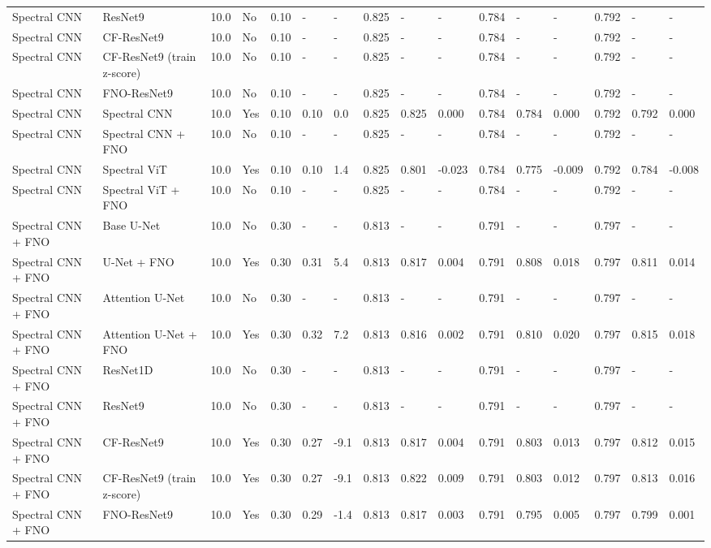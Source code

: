 \begin{longtable}{llllllllllllllll}
Spectral CNN & ResNet9 & 10.0 & No & 0.10 & - & - & 0.825 & - & - & 0.784 & - & - & 0.792 & - & - \\
Spectral CNN & CF-ResNet9 & 10.0 & No & 0.10 & - & - & 0.825 & - & - & 0.784 & - & - & 0.792 & - & - \\
Spectral CNN & CF-ResNet9 (train z-score) & 10.0 & No & 0.10 & - & - & 0.825 & - & - & 0.784 & - & - & 0.792 & - & - \\
Spectral CNN & FNO-ResNet9 & 10.0 & No & 0.10 & - & - & 0.825 & - & - & 0.784 & - & - & 0.792 & - & - \\
Spectral CNN & Spectral CNN & 10.0 & Yes & 0.10 & 0.10 & 0.0 & 0.825 & 0.825 & 0.000 & 0.784 & 0.784 & 0.000 & 0.792 & 0.792 & 0.000 \\
Spectral CNN & Spectral CNN + FNO & 10.0 & No & 0.10 & - & - & 0.825 & - & - & 0.784 & - & - & 0.792 & - & - \\
Spectral CNN & Spectral ViT & 10.0 & Yes & 0.10 & 0.10 & 1.4 & 0.825 & 0.801 & -0.023 & 0.784 & 0.775 & -0.009 & 0.792 & 0.784 & -0.008 \\
Spectral CNN & Spectral ViT + FNO & 10.0 & No & 0.10 & - & - & 0.825 & - & - & 0.784 & - & - & 0.792 & - & - \\
Spectral CNN + FNO & Base U-Net & 10.0 & No & 0.30 & - & - & 0.813 & - & - & 0.791 & - & - & 0.797 & - & - \\
Spectral CNN + FNO & U-Net + FNO & 10.0 & Yes & 0.30 & 0.31 & 5.4 & 0.813 & 0.817 & 0.004 & 0.791 & 0.808 & 0.018 & 0.797 & 0.811 & 0.014 \\
Spectral CNN + FNO & Attention U-Net & 10.0 & No & 0.30 & - & - & 0.813 & - & - & 0.791 & - & - & 0.797 & - & - \\
Spectral CNN + FNO & Attention U-Net + FNO & 10.0 & Yes & 0.30 & 0.32 & 7.2 & 0.813 & 0.816 & 0.002 & 0.791 & 0.810 & 0.020 & 0.797 & 0.815 & 0.018 \\
Spectral CNN + FNO & ResNet1D & 10.0 & No & 0.30 & - & - & 0.813 & - & - & 0.791 & - & - & 0.797 & - & - \\
Spectral CNN + FNO & ResNet9 & 10.0 & No & 0.30 & - & - & 0.813 & - & - & 0.791 & - & - & 0.797 & - & - \\
Spectral CNN + FNO & CF-ResNet9 & 10.0 & Yes & 0.30 & 0.27 & -9.1 & 0.813 & 0.817 & 0.004 & 0.791 & 0.803 & 0.013 & 0.797 & 0.812 & 0.015 \\
Spectral CNN + FNO & CF-ResNet9 (train z-score) & 10.0 & Yes & 0.30 & 0.27 & -9.1 & 0.813 & 0.822 & 0.009 & 0.791 & 0.803 & 0.012 & 0.797 & 0.813 & 0.016 \\
Spectral CNN + FNO & FNO-ResNet9 & 10.0 & Yes & 0.30 & 0.29 & -1.4 & 0.813 & 0.817 & 0.003 & 0.791 & 0.795 & 0.005 & 0.797 & 0.799 & 0.001 \\

\end{longtable}
